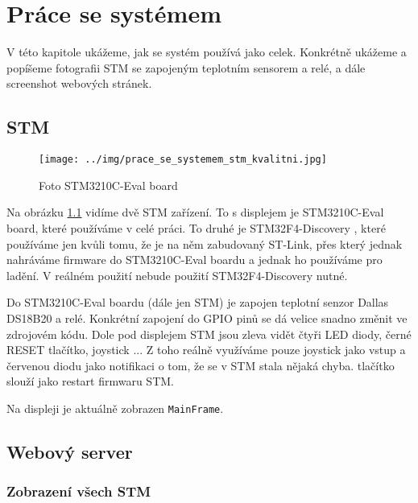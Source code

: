 
\chapter{Práce se systémem}
V této kapitole ukážeme, jak se systém používá jako celek.
Konkrétně ukážeme a popíšeme fotografii STM se zapojeným teplotním sensorem a relé, a dále
screenshot webových stránek.

\section{STM}

\begin{figure}[tbh!]
\texttt{[image: ../img/prace\_se\_systemem\_stm\_kvalitni.jpg]}
\caption{Foto STM3210C-Eval board}
\label{stm-foto}
\end{figure}

Na obrázku \ref{stm-foto} vidíme dvě STM zařízení.
To s displejem je STM3210C-Eval board, které používáme v celé práci.
To druhé je STM32F4-Discovery \cite{STM32F4-Discovery}, které používáme jen kvůli tomu, že je na něm
zabudovaný ST-Link, přes který jednak nahráváme firmware do STM3210C-Eval boardu a jednak ho používáme
pro ladění.
V reálném použití nebude použití STM32F4-Discovery nutné.

Do STM3210C-Eval boardu (dále jen STM) je zapojen teplotní senzor Dallas DS18B20 \cite{DS18B20}
a relé.
Konkrétní zapojení do GPIO pinů se dá velice snadno změnit ve zdrojovém kódu.
Dole pod displejem STM jsou zleva vidět čtyři LED diody, černé RESET tlačítko, joystick ...
Z toho reálně využíváme pouze joystick jako vstup a červenou diodu jako notifikaci o tom, že
se v STM stala nějaká chyba.
 tlačítko slouží jako restart firmwaru STM.

Na displeji je aktuálně zobrazen \texttt{MainFrame}.


\section{Webový server}

\subsection{Zobrazení všech STM}


